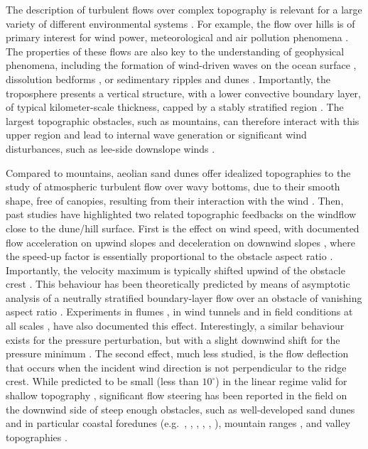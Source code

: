 The description of turbulent flows over complex topography is relevant for a large variety of different environmental systems \citep{Sherman1978, Walmsley1982, baines1995, Wood2000, Venditti2013, Finnigan2020}. For example, the flow over hills is of primary interest for wind power, meteorological and air pollution phenomena \citep{Taylor1987}. The properties of these flows are also key to the understanding of geophysical phenomena, including the formation of wind-driven waves on the ocean surface \citep{Sullivan2010}, dissolution bedforms \citep{Claudin2017, Guerin2020}, or sedimentary ripples and dunes \citep{Bagnold1941, Charru2013, Courrech2015}. Importantly, the troposphere presents a vertical structure, with a lower convective boundary layer, of typical kilometer-scale thickness, capped by a stably stratified region \citep{Stull1988}. The largest topographic obstacles, such as mountains, can therefore interact with this upper region and lead to internal wave generation or significant wind disturbances, such as lee-side downslope winds \citep{Durran1990}.

Compared to mountains, aeolian sand dunes offer idealized topographies to the study of atmospheric turbulent flow over wavy bottoms, due to their smooth shape, free of canopies, resulting from their interaction with the wind \citep{Bagnold1941}. Then, past studies have highlighted two related topographic feedbacks on the windflow close to the dune/hill surface.
%
First is the effect on wind speed, with documented flow acceleration on upwind slopes \citep{Weaver2011} and deceleration on downwind slopes \citep{Baddock2007}, where the speed-up factor is essentially proportional to the obstacle aspect ratio \citep{Jackson1975}. Importantly, the velocity maximum is typically shifted upwind of the obstacle crest \citep{Jackson1975, Claudin2013}. This behaviour has been theoretically predicted by means of asymptotic analysis of a neutrally stratified boundary-layer flow over an obstacle of vanishing aspect ratio \citep{Jackson1975, Mason1979, Sykes1980, Hunt1988, Belcher1998}. Experiments in flumes \citep{Zilker1977, Zilker1979, Frederick1988, Poggi2007, Bristow2022}, in wind tunnels \citep{Gong1989, Finnigan1990, Gong1996} and in field conditions at all scales \citep{Taylor1987a, Claudin2013, Fernando2019, Lu2021}, have also documented this effect. Interestingly, a similar behaviour exists for the pressure perturbation, but with a slight downwind shift for the pressure minimum \citep{Claudin2021}. The second effect, much less studied, is the flow deflection that occurs when the incident wind direction is not perpendicular to the ridge crest. While predicted to be small (less than $10^{\circ}$) in the linear regime valid for shallow topography \citep{Gadal2019}, significant flow steering has been reported in the field on the downwind side of steep enough obstacles, such as well-developed sand dunes \citep{Tsoar1983, Sweet1990, Walker2002, Smith2017} and in particular coastal foredunes (e.g.~\citet{rasmussen1989}, \citet{Walker2006}, \citet{Walker2009}, \citet{Hesp2015}, \citet{Walker2017}, \citet{deWinter2020}), mountain ranges \citep{Kim2000, Lewis2008, Fernando2019}, and valley topographies \citep{Wiggs2002, Garvey2005}.

